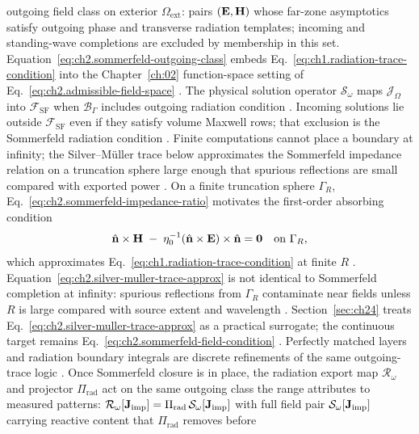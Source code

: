outgoing field class on exterior \(\Omega_{\mathrm{ext}}\): pairs \((\mathbf{E},\mathbf{H})\) whose
far-zone asymptotics satisfy outgoing phase and transverse radiation templates;
incoming and standing-wave completions are excluded by membership in this set.
Equation~\eqref{eq:ch2.sommerfeld-outgoing-class} embeds Eq.~\eqref{eq:ch1.radiation-trace-condition}
into the Chapter~\ref{ch:02} function-space setting of
Eq.~\eqref{eq:ch2.admissible-field-space} \cite{stratton1941}. The physical
solution operator \(\mathcal{S}_\omega\) maps \(\mathcal{J}_\Omega\) into
\(\mathcal{F}_{\mathrm{SF}}\) when \(\mathcal{B}_\Gamma\) includes outgoing radiation condition
\cite{harrington2001}. Incoming solutions lie outside
\(\mathcal{F}_{\mathrm{SF}}\) even if they satisfy volume Maxwell rows; that exclusion is the Sommerfeld radiation condition \cite{stratton1941}.
Finite computations cannot place a boundary at infinity; the Silver--M\"uller trace below
approximates the Sommerfeld impedance relation on a truncation sphere large enough that
spurious reflections are small compared with exported power \cite{harrington2001}. On a finite
truncation sphere \(\Gamma_R\), Eq.~\eqref{eq:ch2.sommerfeld-impedance-ratio}
motivates the first-order absorbing condition
\begin{equation}
\label{eq:ch2.silver-muller-trace-approx}
\hat{\mathbf{n}}\times\mathbf{H}
\;-\;
\eta_0^{-1}(\hat{\mathbf{n}}\times\mathbf{E})\times\hat{\mathbf{n}}
=
\mathbf{0}\quad\text{on }\Gamma_R,
\end{equation}
which approximates Eq.~\eqref{eq:ch1.radiation-trace-condition} at finite \(R\)
\cite{stratton1941}. Equation~\eqref{eq:ch2.silver-muller-trace-approx}
is not identical to Sommerfeld completion at infinity: spurious reflections from
\(\Gamma_R\) contaminate near fields unless \(R\) is large compared with source
extent and wavelength \cite{harrington2001}. Section~\ref{sec:ch24} treats
Eq.~\eqref{eq:ch2.silver-muller-trace-approx} as a practical surrogate; the
continuous target remains Eq.~\eqref{eq:ch2.sommerfeld-field-condition}
\cite{stratton1941}. Perfectly matched layers and radiation boundary integrals are
discrete refinements of the same outgoing-trace logic \cite{harrington2001}.
Once Sommerfeld closure is in place, the radiation export map $\mathcal{R}_\omega$ and projector
$\Pi_{\mathrm{rad}}$ act on the same outgoing class the range attributes to measured patterns:
$\mathcal{R}_\omega[\mathbf{J}_{\mathrm{imp}}]=\Pi_{\mathrm{rad}}\,\mathcal{S}_\omega[\mathbf{J}_{\mathrm{imp}}]$ with full field pair
$\mathcal{S}_\omega[\mathbf{J}_{\mathrm{imp}}]$ carrying reactive content that $\Pi_{\mathrm{rad}}$ removes before
